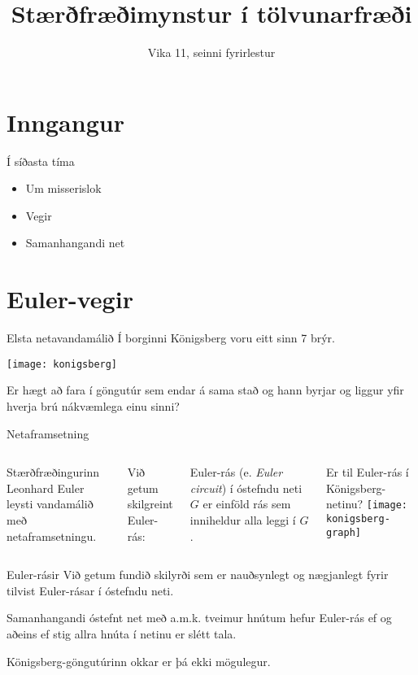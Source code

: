 \documentclass{beamer}
\title{Stærðfræðimynstur í tölvunarfræði}
\subtitle{Vika 11, seinni fyrirlestur}
\begin{document}
\begin{frame}
\titlepage
\end{frame}


\section{Inngangur}

\begin{frame}{Í síðasta tíma}
\begin{itemize}
 \item Um misserislok
 \item Vegir 
 \item Samanhangandi net
\end{itemize}
\end{frame}

\section{Euler-vegir}

\begin{frame}{Elsta netavandamálið}
Í borginni Königsberg voru eitt sinn 7 brýr.
\begin{center}
\texttt{[image: konigsberg]}
\end{center}
Er hægt að fara í göngutúr sem endar á sama stað og hann byrjar og liggur yfir hverja brú nákvæmlega einu sinni?
\end{frame}

\begin{frame}{Netaframsetning}
\begin{columns}
Stærðfræðingurinn Leonhard Euler leysti vandamálið með netaframsetningu.

Við getum skilgreint Euler-rás:

\begin{tcolorbox}[title=Euler-rás]
Euler-rás (e. \emph{Euler circuit}) í óstefndu neti $G$ er einföld rás sem inniheldur alla leggi í $G$.
\end{tcolorbox}
Er til Euler-rás í Königsberg-netinu?
\texttt{[image: konigsberg-graph]}
\end{columns}
\end{frame}

\begin{frame}{Euler-rásir}
Við getum fundið skilyrði sem er nauðsynlegt og nægjanlegt fyrir tilvist Euler-rásar í óstefndu neti.

\begin{tcolorbox}
Samanhangandi óstefnt net með a.m.k. tveimur hnútum hefur Euler-rás ef og aðeins ef stig allra hnúta í netinu er slétt tala.
\end{tcolorbox}

Königsberg-göngutúrinn okkar er þá ekki mögulegur.
\end{frame}
\end{document}
